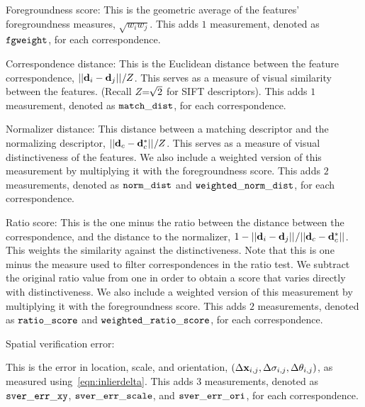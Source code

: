 \begin{itemln}

    \item Foregroundness score:
    This is the geometric average of the features' foregroundness measures, $\sqrt{w_i w_j}$.
    This adds $1$ measurement, denoted as $\tt{fgweight}$, for each correspondence.

    \item Correspondence distance:
    This is the Euclidean distance between the feature correspondence, $||\mathbf{d}_i - \mathbf{d}_j||_{} / Z$.
    This serves as a measure of visual similarity between the features.
    (Recall $Z\mkern-6mu=\mkern-6mu\sqrt{2}$ for SIFT descriptors).
    This adds $1$ measurement, denoted as $\tt{match\_dist}$, for each correspondence.

    \item Normalizer distance:
    This distance between a matching descriptor and the normalizing descriptor, %
        $||\mathbf{d}_c - \mathbf{d}^{*}_c||_{} / Z$.
        This serves as a measure of visual distinctiveness of the features.
    We also include a weighted version of this measurement by multiplying it with the foregroundness score.
    This adds $2$ measurements, denoted as $\tt{norm\_dist}$ and $\tt{weighted\_norm\_dist}$, for each correspondence.

    \item Ratio score:
    This is the one minus the ratio between the distance between the correspondence, and the distance to the
      normalizer, %
    $1 - ||\mathbf{d}_i - \mathbf{d}_j||_{} / ||\mathbf{d}_c - \mathbf{d}^{*}_c||_{}$.
    This weights the similarity against the distinctiveness.
    Note that this is one minus the measure used to filter correspondences in the ratio test.
    We subtract the original ratio value from one in order to obtain a score that varies directly with
      distinctiveness.
    We also include a weighted version of this measurement by multiplying it with the foregroundness score.
    This adds $2$ measurements, denoted as $\tt{ratio\_score}$ and $\tt{weighted\_ratio\_score}$, for each correspondence.
        
    \item Spatial verification error:

        This is the error in location, scale, and orientation, $( %
            \Delta \pt_{i, j}, %
            \Delta \scale_{i, j}, %
            \Delta \ori_{i, j})$, as measured using~\cref{eqn:inlierdelta}.
            This adds $3$ measurements, denoted as $\tt{sver\_err\_xy}$, $\tt{sver\_err\_scale}$, and
              $\tt{sver\_err\_ori}$, for each correspondence.


\end{itemln}
